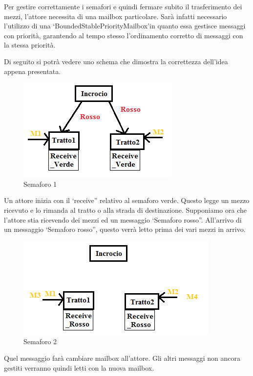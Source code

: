 \documentclass{article}
\begin{document}
Per gestire correttamente i semafori e quindi fermare subito il trasferimento dei mezzi, l\textquoteright{}attore necessita di una mailbox particolare. Sar\`{a} infatti necessario l\textquoteright{}utilizzo di una \lq BoundedStablePriorityMailbox\rq in quanto essa gestisce messaggi con priorit\`{a}, garantendo al tempo stesso l\textquoteright{}ordinamento corretto di messaggi con la stessa priorit\`{a}. 
\par Di seguito si potr\`{a} vedere uno schema che dimostra la correttezza dell\textquoteright{}idea appena presentata.
\begin{figure}[H]
\begin{center}
\includegraphics{./img/Semaforo1.png}
\caption{Semaforo 1}
\label{fig:Semaforo 1}
\end{center}
\end{figure}
Un attore inizia con il \lq receive” relativo al semaforo verde. Questo legge un mezzo ricevuto e lo rimanda al tratto o alla strada di destinazione. Supponiamo ora che l\textquoteright{}attore stia ricevendo dei mezzi ed un messaggio \lq Semaforo rosso”. All\textquoteright{}arrivo di un messaggio \lq Semaforo rosso”, questo verr\`{a} letto prima dei vari mezzi in arrivo.
\begin{figure}[H]
\begin{center}
\includegraphics{./img/Semaforo2.png}
\caption{Semaforo 2}
\label{fig:Semaforo 2}
\end{center}
\end{figure}
Quel messaggio far\`{a} cambiare mailbox all\textquoteright{}attore. Gli altri messaggi non ancora gestiti verranno quindi letti con la nuova mailbox. 
\end{document}
